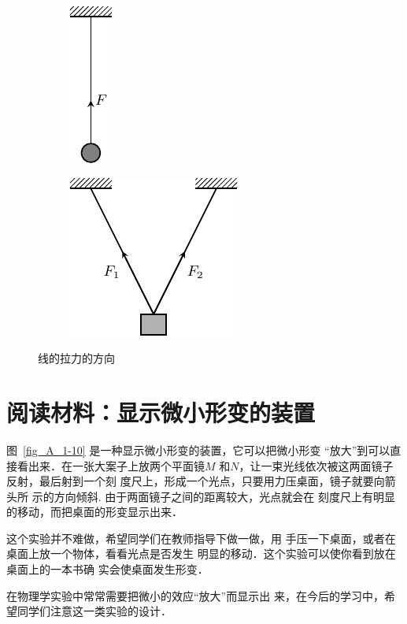 \begin{figure} [htp]\centering
\begin{subfigure} {0.46\linewidth} 
	\centering
	\includegraphics{fig/A/1-9a.pdf} 
	\caption{} \label{fig_A_1-9a} 
\end{subfigure} 
\hfil
\begin{subfigure} {0.46\linewidth} 
	\centering
	\includegraphics{fig/A/1-9b.pdf} 
	\caption{} \label{fig_A_1-9b} 
\end{subfigure} 
\caption{线的拉力的方向} \label{fig_A_1-9} 
\end{figure} 

\section*{阅读材料：显示微小形变的装置} 


图~\ref{fig_A_1-10} 是一种显示微小形变的装置，它可以把微小形变
“放大”到可以直接看出来．在一张大案子上放两个平面镜$M$
和$N$，让一束光线依次被这两面镜子反射，最后射到一个刻
度尺上，形成一个光点，只要用力压桌面，镜子就要向箭头所
示的方向倾斜. 由于两面镜子之间的距离较大，光点就会在
刻度尺上有明显的移动，而把桌面的形变显示出来．

    这个实验并不难做，希望同学们在教师指导下做一做，用
手压一下桌面，或者在桌面上放一个物体，看看光点是否发生
明显的移动．这个实验可以使你看到放在桌面上的一本书确
实会使桌面发生形变．

    在物理学实验中常常需要把微小的效应“放大”而显示出
来，在今后的学习中，希望同学们注意这一类实验的设计．

